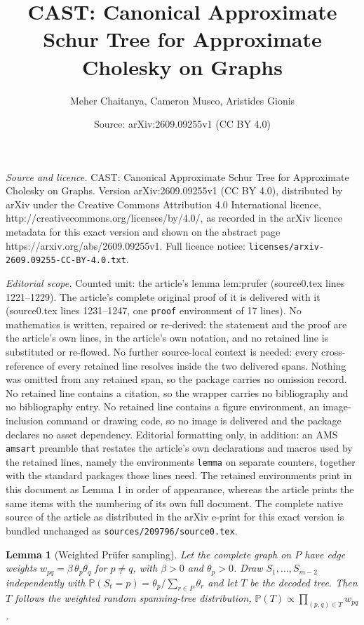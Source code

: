 \documentclass[10pt,a4paper]{amsart}
\title{CAST: Canonical Approximate Schur Tree for Approximate Cholesky on Graphs}
\author{Meher Chaitanya, Cameron Musco, Aristides Gionis}
\date{Source: arXiv:2609.09255v1 (CC BY 4.0)}
\newtheorem{lemma}{Lemma}
\renewcommand{\Pr}[1]{\mathbb{P}\left(#1\right)}
\begin{document}
\maketitle

\noindent\emph{Source and licence.} CAST: Canonical Approximate Schur Tree for Approximate Cholesky on Graphs. Version arXiv:2609.09255v1 (CC BY 4.0), distributed by arXiv under the Creative Commons Attribution 4.0 International licence, http://creativecommons.org/licenses/by/4.0/, as recorded in the arXiv licence metadata for this exact version and shown on the abstract page https://arxiv.org/abs/2609.09255v1. Full licence notice: \texttt{licenses/arxiv-2609.09255-CC-BY-4.0.txt}.\par\smallskip

\noindent\textit{Editorial scope.} Counted unit: the article's lemma lem:prufer (source0.tex lines 1221--1229). The article's complete original proof of it is delivered with it (source0.tex lines 1231--1247, one \texttt{proof} environment of 17 lines). No mathematics is written, repaired or re-derived: the statement and the proof are the article's own lines, in the article's own notation, and no retained line is substituted or re-flowed.  No further source-local context is needed: every cross-reference of every retained line resolves inside the two delivered spans.  Nothing was omitted from any retained span, so the package carries no omission record.  No retained line contains a citation, so the wrapper carries no bibliography and no bibliography entry.  No retained line contains a figure environment, an image-inclusion command or drawing code, so no image is delivered and the package declares no asset dependency.  Editorial formatting only, in addition: an AMS \texttt{amsart} preamble that restates the article's own declarations and macros used by the retained lines, namely the environments \texttt{lemma} on separate counters, together with the standard packages those lines need.  The retained environments print in this document as Lemma 1 in order of appearance, whereas the article prints the same items with the numbering of its own full document.  The complete native source of the article as distributed in the arXiv e-print for this exact version is bundled unchanged as \texttt{sources/209796/source0.tex}.
\begin{lemma}[Weighted Pr\"ufer sampling]
\label{lem:prufer}
Let the complete graph on $P$ have edge weights
$w_{pq}=\beta\,\theta_p\theta_q$ for $p\neq q$, with $\beta>0$ and
$\theta_p>0$. Draw $S_1,\ldots,S_{m-2}$ independently with
$\Pr{S_t=p}=\theta_p/\sum_{r\in P}\theta_r$ and let $T$ be the decoded
tree. Then $T$ follows the weighted random spanning-tree distribution,
$\Pr{T}\propto\prod_{(p,q)\in T}w_{pq}$.
\end{lemma}
\end{document}
